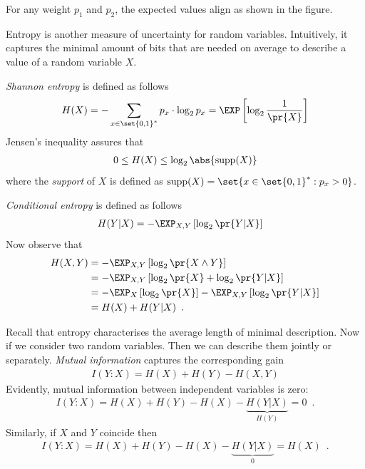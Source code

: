\documentclass[landscape,footrule]{foils}
\newcommand{\lastline}{\vspace*{-2ex}}
\begin{document}

For any weight $p_1$ and $p_2$, the expected values align as shown in the figure.
\lastline



Entropy is another measure of uncertainty for random
variables. Intuitively, it captures the minimal amount of bits that
are needed on average to describe a value of a random variable $X$.

\emph{Shannon entropy} is defined as follows
\begin{align*}
  H(X)=-\sum_{x\in\set{0,1}^*} p_x\cdot \log_2 p_x=\E{\log_2 \frac{1}{\pr{X}}}
\end{align*}
Jensen's inequality assures that 
\begin{align*}
  0\leq H(X)\leq\log_2 \abs{\supp(X)}
\end{align*}
where the \emph{support} of $X$ is defined as $\supp(X)=\set{x\in\set{0,1}^*:p_x>0}$.
\lastline


\emph{Conditional entropy} is defined as follows
\begin{align*}
  H(Y|X) &=-\EXP_{X,Y}\left[\log_2\pr{Y|X}\right]
\end{align*}
Now observe that 
\begin{align*}
  H(X,Y)&=-\EXP_{X,Y}\left[\log_2\pr{X\wedge Y}\right]\\
  &=-\EXP_{X,Y}\left[\log_2\pr{X}+\log_2  \pr{Y|X}\right]\\
  &=-\EXP_{X}\left[\log_2\pr{X}\right]-\EXP_{X,Y}\left[ \log_2 \pr{Y|X}\right]\\
  &=H(X) +H(Y|X)\enspace.  
\end{align*}


Recall that entropy characterises the average length of minimal
description. Now if we consider two random variables. Then we can
describe them jointly or separately.  \emph{Mutual information}
captures the corresponding gain
\begin{align*}
  I(Y:X)=H(X)+H(Y)-H(X,Y)
\end{align*}
Evidently, mutual information between independent variables is zero:
\begin{align*}
  I(Y:X)=H(X)+H(Y)-H(X)-\underbrace{H(Y|X)}_{H(Y)}=0\enspace.
\end{align*}
Similarly, if $X$ and $Y$ coincide then
\begin{align*}
  I(Y:X)=H(X)+H(Y)-H(X)- \underbrace{H(Y|X)}_0=H(X)\enspace.
\end{align*}
 
\end{document}
